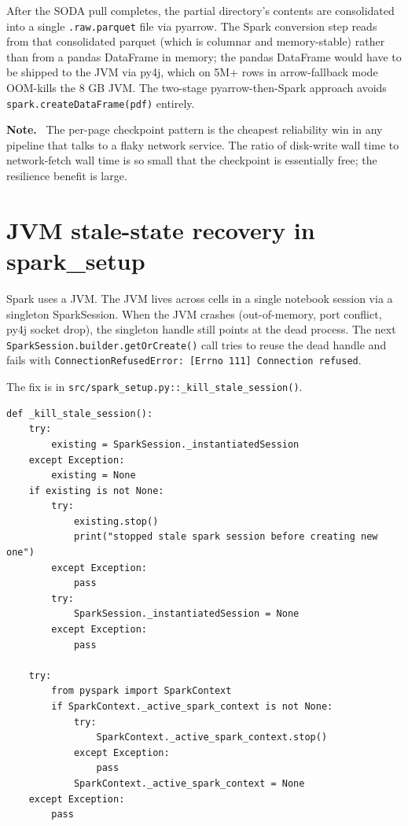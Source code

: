 \documentclass[11pt,letterpaper]{book}
\newenvironment{notebox}{\begin{framed}\textbf{Note.}~}{\end{framed}}
\begin{document}
After the SODA pull completes, the partial directory's contents are consolidated into a single \texttt{.raw.parquet} file via pyarrow. The Spark conversion step reads from that consolidated parquet (which is columnar and memory-stable) rather than from a pandas DataFrame in memory; the pandas DataFrame would have to be shipped to the JVM via py4j, which on 5M+ rows in arrow-fallback mode OOM-kills the 8 GB JVM. The two-stage pyarrow-then-Spark approach avoids \texttt{spark.createDataFrame(pdf)} entirely.

\begin{notebox}
The per-page checkpoint pattern is the cheapest reliability win in any pipeline that talks to a flaky network service. The ratio of disk-write wall time to network-fetch wall time is so small that the checkpoint is essentially free; the resilience benefit is large.
\end{notebox}

\section{JVM stale-state recovery in spark\_setup}

Spark uses a JVM. The JVM lives across cells in a single notebook session via a singleton SparkSession. When the JVM crashes (out-of-memory, port conflict, py4j socket drop), the singleton handle still points at the dead process. The next \texttt{SparkSession.builder.getOrCreate()} call tries to reuse the dead handle and fails with \texttt{ConnectionRefusedError: [Errno 111] Connection refused}.

The fix is in \texttt{src/spark\_setup.py::\_kill\_stale\_session()}.

\begin{lstlisting}
def _kill_stale_session():
    try:
        existing = SparkSession._instantiatedSession
    except Exception:
        existing = None
    if existing is not None:
        try:
            existing.stop()
            print("stopped stale spark session before creating new one")
        except Exception:
            pass
        try:
            SparkSession._instantiatedSession = None
        except Exception:
            pass

    try:
        from pyspark import SparkContext
        if SparkContext._active_spark_context is not None:
            try:
                SparkContext._active_spark_context.stop()
            except Exception:
                pass
            SparkContext._active_spark_context = None
    except Exception:
        pass
\end{lstlisting}
\end{document}
